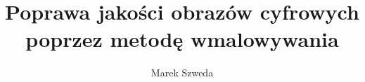 \documentclass[12pt, twoside, openany]{report}
\author{Marek Szweda}
\title{Poprawa jakości obrazów cyfrowych poprzez metodę wmalowywania}
\theoremstyle{definition}
\begin{document}
\def \kotmyszm{obr. nr 1}
\def \maciekIm{obr. nr 2}
\def \ObrIm{obr. nr 3}
\def \ObrIVm{obr. nr 4}
\def \ObrVm{obr. nr 5}
\def \ObrVIm{obr. nr 6}
\def \ObrXVm{obr. nr 7}
\def \ObrXVIIm{obr. nr 8}
\def \ObrXIXm{obr. nr 9}
\def \ObrXXVIIIkm{obr. nr 10}
\def \OsobaDrugam{obr. nr 11}
\def \ObrXIIIm{obr. nr 12}
\def \XXVIII{obr. nr 1}
\def \TEST{obr. nr 2}
\def \Wood{obr. nr 3}

\def \SNRI{obr. nr 1}
\def \SNRII{obr. nr 2}
\def \SNRIII{obr. nr 3}
\def \SNRIV{obr. nr 4}

\def \kotmyszmu{obrazu nr 1}
\def \maciekImu{obrazu nr 2}
\def \ObrImu{obrazu nr 3}
\def \ObrIVmu{obrazu nr 4}
\def \ObrVmu{obrazu nr 5}
\def \ObrVImu{obrazu nr 6}
\def \ObrXVmu{obrazu nr 7}
\def \ObrXVIImu{obrazu nr 8}
\def \ObrXIXmu{obrazu nr 9}
\def \ObrXXVIIIkmu{obrazu nr 10}
\def \OsobaDrugamu{obrazu nr 11}
\def \ObrXIIImu{obrazu nr 12}
\def \XXVIII{obrazu nr 1}
\def \TEST{obrazu nr 2}
\def \Wood{obrazu nr 3}

\def \SNRIu{obrazu nr 1}
\def \SNRIIu{obrazu nr 2}
\def \SNRIIIu{obrazu nr 3}
\def \SNRIVu{obrazu nr 4}
\end{document}
